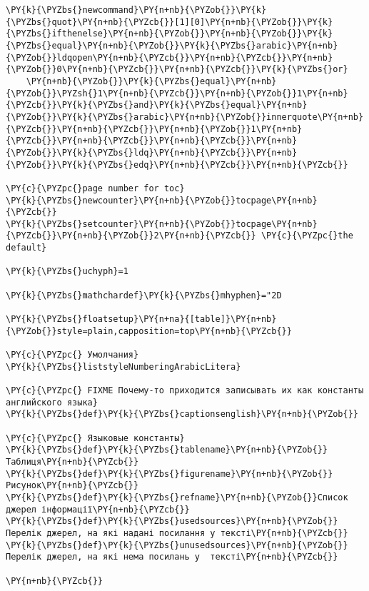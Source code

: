 \begin{Verbatim}[commandchars=\\\{\}]
\PY{k}{\PYZbs{}newcommand}\PY{n+nb}{\PYZob{}}\PY{k}{\PYZbs{}quot}\PY{n+nb}{\PYZcb{}}[1][0]\PY{n+nb}{\PYZob{}}\PY{k}{\PYZbs{}ifthenelse}\PY{n+nb}{\PYZob{}}\PY{n+nb}{\PYZob{}}\PY{k}{\PYZbs{}equal}\PY{n+nb}{\PYZob{}}\PY{k}{\PYZbs{}arabic}\PY{n+nb}{\PYZob{}}ldqopen\PY{n+nb}{\PYZcb{}}\PY{n+nb}{\PYZcb{}}\PY{n+nb}{\PYZob{}}0\PY{n+nb}{\PYZcb{}}\PY{n+nb}{\PYZcb{}}\PY{k}{\PYZbs{}or}
    \PY{n+nb}{\PYZob{}}\PY{k}{\PYZbs{}equal}\PY{n+nb}{\PYZob{}}\PYZsh{}1\PY{n+nb}{\PYZcb{}}\PY{n+nb}{\PYZob{}}1\PY{n+nb}{\PYZcb{}}\PY{k}{\PYZbs{}and}\PY{k}{\PYZbs{}equal}\PY{n+nb}{\PYZob{}}\PY{k}{\PYZbs{}arabic}\PY{n+nb}{\PYZob{}}innerquote\PY{n+nb}{\PYZcb{}}\PY{n+nb}{\PYZcb{}}\PY{n+nb}{\PYZob{}}1\PY{n+nb}{\PYZcb{}}\PY{n+nb}{\PYZcb{}}\PY{n+nb}{\PYZcb{}}\PY{n+nb}{\PYZob{}}\PY{k}{\PYZbs{}ldq}\PY{n+nb}{\PYZcb{}}\PY{n+nb}{\PYZob{}}\PY{k}{\PYZbs{}edq}\PY{n+nb}{\PYZcb{}}\PY{n+nb}{\PYZcb{}}

\PY{c}{\PYZpc{}page number for toc}
\PY{k}{\PYZbs{}newcounter}\PY{n+nb}{\PYZob{}}tocpage\PY{n+nb}{\PYZcb{}}
\PY{k}{\PYZbs{}setcounter}\PY{n+nb}{\PYZob{}}tocpage\PY{n+nb}{\PYZcb{}}\PY{n+nb}{\PYZob{}}2\PY{n+nb}{\PYZcb{}} \PY{c}{\PYZpc{}the default}

\PY{k}{\PYZbs{}uchyph}=1

\PY{k}{\PYZbs{}mathchardef}\PY{k}{\PYZbs{}mhyphen}="2D

\PY{k}{\PYZbs{}floatsetup}\PY{n+na}{[table]}\PY{n+nb}{\PYZob{}}style=plain,capposition=top\PY{n+nb}{\PYZcb{}}

\PY{c}{\PYZpc{} Умолчания}
\PY{k}{\PYZbs{}liststyleNumberingArabicLitera}

\PY{c}{\PYZpc{} FIXME Почему-то приходится записывать их как константы английского языка}
\PY{k}{\PYZbs{}def}\PY{k}{\PYZbs{}captionsenglish}\PY{n+nb}{\PYZob{}}

\PY{c}{\PYZpc{} Языковые константы}
\PY{k}{\PYZbs{}def}\PY{k}{\PYZbs{}tablename}\PY{n+nb}{\PYZob{}}Таблиця\PY{n+nb}{\PYZcb{}}
\PY{k}{\PYZbs{}def}\PY{k}{\PYZbs{}figurename}\PY{n+nb}{\PYZob{}}Рисунок\PY{n+nb}{\PYZcb{}}
\PY{k}{\PYZbs{}def}\PY{k}{\PYZbs{}refname}\PY{n+nb}{\PYZob{}}Список джерел інформації\PY{n+nb}{\PYZcb{}}
\PY{k}{\PYZbs{}def}\PY{k}{\PYZbs{}usedsources}\PY{n+nb}{\PYZob{}}Перелік джерел, на які надані посилання у тексті\PY{n+nb}{\PYZcb{}}
\PY{k}{\PYZbs{}def}\PY{k}{\PYZbs{}unusedsources}\PY{n+nb}{\PYZob{}}Перелік джерел, на які нема посилань у  тексті\PY{n+nb}{\PYZcb{}}

\PY{n+nb}{\PYZcb{}}
\end{Verbatim}
